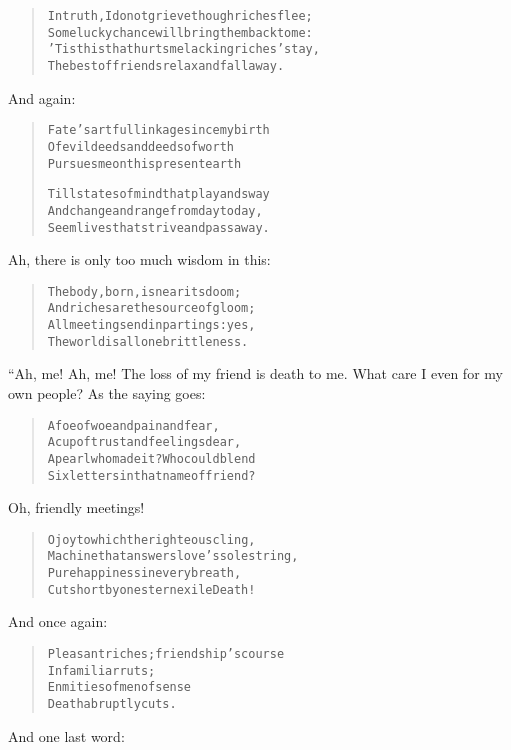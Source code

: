 \documentclass[article, twoside, 14pt]{memoir}
\renewenvironment{verbatim}{%
\begin{quote}%
\vskip -10pt%
\begin{alltt}\normalfont\large}{\end{alltt}%
\end{quote}%
\vskip -10pt
} %
\begin{document}
\begin{verbatim}
In truth, I do not grieve though riches flee;
Some lucky chance will bring them back to me:
'Tis this that hurts me{\textemdash}lacking riches' stay,
The best of friends relax and fall away.
\end{verbatim}
And again:

\begin{verbatim}
Fate's artful linkage since my birth
Of evil deeds and deeds of worth
Pursues me on this present earth

Till states of mind that play and sway
And change and range from day to day,
Seem lives that strive and pass away.
\end{verbatim}
Ah, there is only too much wisdom in this:

\begin{verbatim}
The body, born, is near its doom;
And riches are the source of gloom;
All meetings end in partings: yes,
The world is all one brittleness.
\end{verbatim}
“Ah, me! Ah, me! The loss of my friend is death to me. What care I
even for my own people? As the saying goes:

\begin{verbatim}
A foe of woe and pain and fear,
A cup of trust and feelings dear,
A pearl{\textemdash}who made it? Who could blend
Six letters in that name of friend?
\end{verbatim}
Oh, friendly meetings!

\begin{verbatim}
O joy to which the righteous cling,
Machine that answers love's sole string,
Pure happiness in every breath,
Cut short by one stern exile{\textemdash}Death!
\end{verbatim}
And once again:

\begin{verbatim}
Pleasant riches; friendship's course
    In familiar ruts;
Enmities of men of sense{\textemdash}
    Death abruptly cuts.
\end{verbatim}
And one last word:
\end{document}
